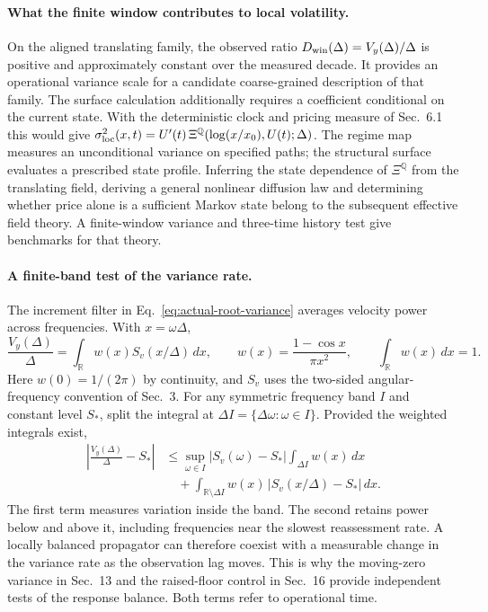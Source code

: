 \documentclass[11pt]{article}
\begin{document}
\paragraph{What the finite window contributes to local volatility.}
On the aligned translating family, the observed ratio
\(D_{\rm win}(\Delta)=V_y(\Delta)/\Delta\) is positive and approximately
constant over the measured decade. It provides an operational variance
scale for a candidate coarse-grained description of that family.
The surface calculation additionally requires a coefficient conditional
on the current state. With the deterministic clock and pricing measure
of Sec.~6.1 this would give
\(\sigma_{\rm loc}^2(x,t)=U'(t)\,\Xi^{\mathbb Q}(\log(x/x_0),U(t);\Delta)\).
The regime map measures an unconditional variance on specified paths;
the structural surface evaluates a prescribed state profile. Inferring
the state dependence of \(\Xi^{\mathbb Q}\) from the translating field,
deriving a general nonlinear diffusion law and determining whether price
alone is a sufficient Markov state belong to the subsequent effective
field theory. A finite-window variance and three-time history test give
benchmarks for that theory.

\paragraph{A finite-band test of the variance rate.}
The increment filter in Eq.~\eqref{eq:actual-root-variance} averages
velocity power across frequencies. With \(x=\omega\Delta\),
\[
 \frac{V_y(\Delta)}{\Delta}
 =\int_{\mathbb R} w(x) S_v(x/\Delta)\,dx,\qquad
 w(x)=\frac{1-\cos x}{\pi x^2},\qquad
 \int_{\mathbb R}w(x)\,dx=1 .
\]
Here \(w(0)=1/(2\pi)\) by continuity, and \(S_v\) uses the two-sided
angular-frequency convention of Sec.~3. For any symmetric frequency
band \(I\) and constant level \(S_*\), split the integral at
\(\Delta I=\{\Delta\omega:\omega\in I\}\). Provided the weighted
integrals exist,
\begin{align*}
 \left|\frac{V_y(\Delta)}{\Delta}-S_*\right|
 &\le \sup_{\omega\in I}|S_v(\omega)-S_*|
      \int_{\Delta I}w(x)\,dx \\
 &\quad+\int_{\mathbb R\setminus\Delta I}
      w(x)\,|S_v(x/\Delta)-S_*|\,dx .
\end{align*}
The first term measures variation inside the band. The second retains
power below and above it, including frequencies near the slowest
reassessment rate. A locally balanced propagator can therefore coexist
with a measurable change in the variance rate as the observation lag
moves. This is why the moving-zero variance in Sec.~13 and the raised-floor
control in Sec.~16 provide independent tests of the response balance.
Both terms refer to operational time.
\end{document}
